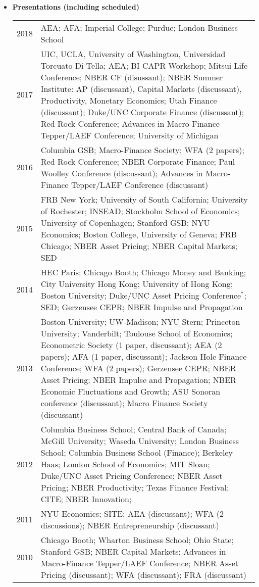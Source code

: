 \documentclass[11pt,letterpaper,serif,overlapped]{res}
\begin{document}
\begin{resume}
\begin{itemize}
\item \textbf{Presentations (including scheduled)} 
\begin{longtable}{lp{15cm}}
2018 & AEA; AFA; Imperial College; Purdue; London Business School\\
2017 & UIC, UCLA, University of Washington, Universidad Torcuato Di Tella; AEA; BI CAPR Workshop; Mitsui Life Conference; NBER CF (disussant); NBER Summer Institute:  AP (discussant), Capital Markets (discussant),  Productivity, Monetary Economics; Utah Finance (discussant); Duke/UNC Corporate Finance (discussant); Red Rock Conference; Advances in Macro-Finance Tepper/LAEF Conference; University of Michigan\\[0.1cm]
2016 & Columbia GSB;  Macro-Finance Society; WFA (2 papers); Red Rock Conference; NBER Corporate Finance; Paul Woolley Conference (discussant); Advances in Macro-Finance Tepper/LAEF Conference (discussant)\\[0.1cm]
2015 & FRB New York; University of South California; University of Rochester; INSEAD; Stockholm School of Economics; University of Copenhagen; Stanford GSB; NYU Economics; Boston College, University of Geneva; FRB Chicago; NBER Asset Pricing;  NBER Capital Markets; SED\\[0.1cm]
2014 &HEC Paris; Chicago Booth; Chicago Money and Banking; City University Hong Kong; University of Hong Kong; Boston University; Duke/UNC Asset Pricing Conference$^*$; SED; Gerzensee CEPR; NBER Impulse and Propagation\\[0.1cm]
2013 & Boston University; UW-Madison; NYU Stern; Princeton University; Vanderbilt; Toulouse School of Economics;  Econometric Society (1 paper, discussant); AEA (2 papers); AFA (1 paper, discussant); Jackson Hole Finance Conference; WFA (2 papers); Gerzensee CEPR; NBER Asset Pricing; NBER Impulse and Propagation;  NBER Economic Fluctuations and Growth; ASU Sonoran conference (discussant); Macro Finance Society (discussant) \\[0.1cm]
2012 & Columbia Business School; Central Bank of Canada; McGill University; Waseda University; London Business School; Columbia Business School (Finance); Berkeley Haas;  London School of Economics; MIT Sloan; Duke/UNC Asset Pricing Conference; NBER Asset Pricing; NBER Productivity; Texas Finance Festival; CITE; NBER Innovation;\\[0.1cm]
2011 & NYU Economics;  SITE; AEA (discussant); WFA (2 discussions); NBER Entrepreneurship (discussant) \\[0.1cm]
2010 & Chicago Booth; Wharton Business School; Ohio State; Stanford GSB; NBER Capital Markets; Advances in Macro-Finance Tepper/LAEF Conference; NBER Asset Pricing (discussant); WFA (discussant); FRA (discussant)  \\[0.1cm]

\end{longtable}
\end{itemize}
\end{resume}
\end{document}
